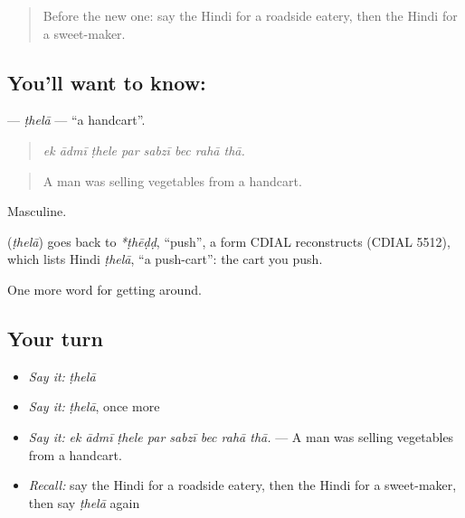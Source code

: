 \label{lesson:HI-C424-thela}



\begin{quote}
Before the new one: say the Hindi for a roadside eatery, then the Hindi for a sweet-maker.
\end{quote}

\subsection*{You'll want to know: }
\textbf{} — \emph{ṭhelā} — \textquotedblleft{}a handcart\textquotedblright{}.

\begin{quote}
       
\end{quote}

\begin{quote}
\emph{ek ādmī ṭhele par sabzī bec rahā thā.}
\end{quote}

\begin{quote}
A man was selling vegetables from a handcart.
\end{quote}

Masculine.

\begin{cousinweb}
\textbf{} (\emph{ṭhelā}) goes back to \emph{*ṭhēḍḍ}, \textquotedblleft{}push\textquotedblright{}, a form CDIAL reconstructs (CDIAL 5512), which lists Hindi \emph{ṭhelā}, \textquotedblleft{}a push-cart\textquotedblright{}: the cart you push.
\end{cousinweb}

\begin{grammarlens}[title={What you've built}]
One more word for getting around.
\end{grammarlens}

\subsection*{Your turn}
\begin{itemize}
\raggedright
  \item \emph{Say it:} \emph{ṭhelā}
  \item \emph{Say it:} \emph{ṭhelā}, once more
  \item \emph{Say it:} \emph{ek ādmī ṭhele par sabzī bec rahā thā.} — A man was selling vegetables from a handcart.
  \item \emph{Recall:} say the Hindi for a roadside eatery, then the Hindi for a sweet-maker, then say \emph{ṭhelā} again
\end{itemize}

